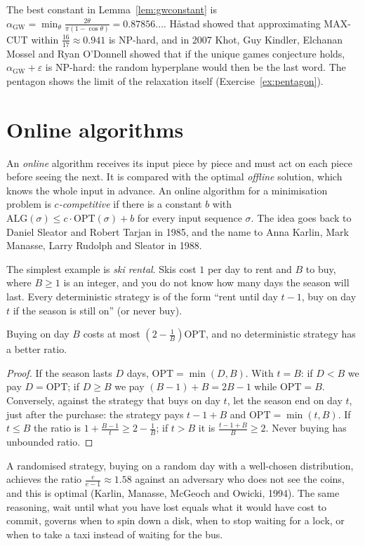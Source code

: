 The best constant in Lemma~\ref{lem:gwconstant} is $\alpha_{\mathrm{GW}}=\min_\theta\frac{2\theta}{\pi(1-\cos\theta)}=0.87856\ldots$. Håstad showed that approximating MAX-CUT within $\frac{16}{17}\approx0.941$ is NP-hard, and in 2007 Khot, Guy Kindler, Elchanan Mossel and Ryan O'Donnell showed that if the unique games conjecture holds, $\alpha_{\mathrm{GW}}+\varepsilon$ is NP-hard: the random hyperplane would then be the last word. The pentagon shows the limit of the relaxation itself (Exercise~\ref{ex:pentagon}).

\section{Online algorithms}\label{sec:online}

An \emph{online} algorithm receives its input piece by piece and must act on each piece before seeing the next. It is compared with the optimal \emph{offline} solution, which knows the whole input in advance. An online algorithm for a minimisation problem is \emph{$c$-competitive} if there is a constant $b$ with $\mathrm{ALG}(\sigma)\le c\cdot\mathrm{OPT}(\sigma)+b$ for every input sequence $\sigma$. The idea goes back to Daniel Sleator and Robert Tarjan in 1985, and the name to Anna Karlin, Mark Manasse, Larry Rudolph and Sleator in 1988.

The simplest example is \emph{ski rental}. Skis cost $1$ per day to rent and $B$ to buy, where $B\ge1$ is an integer, and you do not know how many days the season will last. Every deterministic strategy is of the form ``rent until day $t-1$, buy on day $t$ if the season is still on'' (or never buy).

\begin{proposition}\label{prop:ski}
Buying on day $B$ costs at most $(2-\frac1B)\mathrm{OPT}$, and no deterministic strategy has a better ratio.
\end{proposition}
\begin{proof}
If the season lasts $D$ days, $\mathrm{OPT}=\min(D,B)$. With $t=B$: if $D<B$ we pay $D=\mathrm{OPT}$; if $D\ge B$ we pay $(B-1)+B=2B-1$ while $\mathrm{OPT}=B$. Conversely, against the strategy that buys on day $t$, let the season end on day $t$, just after the purchase: the strategy pays $t-1+B$ and $\mathrm{OPT}=\min(t,B)$. If $t\le B$ the ratio is $1+\frac{B-1}t\ge2-\frac1B$; if $t>B$ it is $\frac{t-1+B}B\ge2$. Never buying has unbounded ratio.
\end{proof}

A randomised strategy, buying on a random day with a well-chosen distribution, achieves the ratio $\frac e{e-1}\approx1.58$ against an adversary who does not see the coins, and this is optimal (Karlin, Manasse, McGeoch and Owicki, 1994). The same reasoning, wait until what you have lost equals what it would have cost to commit, governs when to spin down a disk, when to stop waiting for a lock, or when to take a taxi instead of waiting for the bus.

